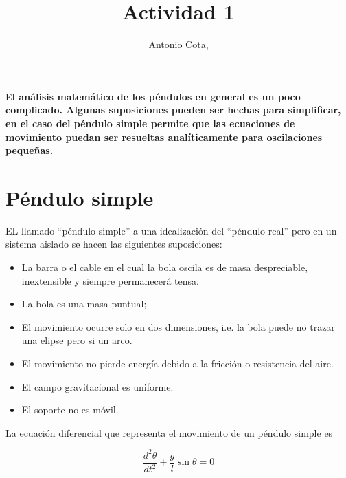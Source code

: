 \documentclass[DIV=calc, paper=a4, fontsize=12pt, twocolumn]{scrartcl}	 %
\title{Actividad 1} %
\author{Antonio Cota, } %
\date{} %
\newcommand{\initial}[1]{ %
\lettrine[lines=3,lhang=0.3,nindent=0em]{
\color{DarkGoldenrod}
{\textsf{#1}}}{}}
\begin{document}
\maketitle %

\thispagestyle{fancy} %


\initial{E}\textbf{l análisis matemático de los péndulos en general es un poco complicado. Algunas suposiciones pueden ser hechas para simplificar, en el caso del péndulo simple permite que las ecuaciones de movimiento puedan ser resueltas analíticamente para oscilaciones pequeñas.}


\section*{Péndulo simple}

EL llamado “péndulo simple” a una idealización del “péndulo real” pero en un sistema aislado se hacen las siguientes suposiciones:

\begin{itemize}
\item La barra o el cable en el cual la bola oscila es de masa despreciable, inextensible y siempre permanecerá tensa.
\item La bola es una masa puntual;
\item El movimiento ocurre solo en dos dimensiones, i.e. la bola puede no trazar una elipse pero si un arco.
\item El movimiento no pierde energía debido a la fricción o resistencia del aire.
\item El campo gravitacional es uniforme.
\item El soporte no es móvil.
\end{itemize}

La ecuación diferencial que representa el movimiento de un péndulo simple es 

\begin{equation}
\frac{d^{2}\theta}{dt^{2}} + \frac{g}{l}\sin{\theta} = 0
\end{equation}
\end{document}
